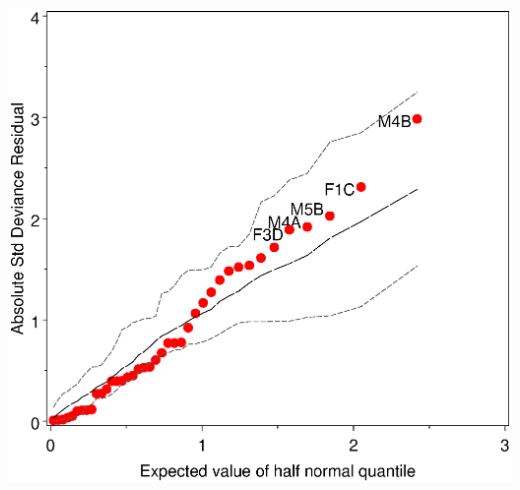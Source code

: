 \begin{center}
\begin{minipage}[c]{.33\linewidth}
 \end{minipage}
 \hfill
 \begin{minipage}[c]{.33\linewidth}
  \includegraphics[width=1\linewidth,clip=true]{ch7/fig/vietgen4}
 \end{minipage}
\end{center}

